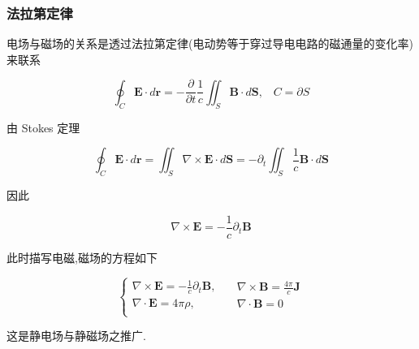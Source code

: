 \documentclass[aspectratio=2516]{beamer}
\begin{document}
\begin{frame}
\frametitle{\kaishu 法拉第定律}

\kaishu

\small

电场与磁场的关系是透过法拉第定律(电动势等于穿过导电电路的磁通量的变化率)来联系

\begin{equation}
\oint_C {\boldsymbol{E} \cdot d\boldsymbol{r}}  =  - \frac{\partial }{{\partial t}}\frac{1}{c}\iint_S {\boldsymbol{B} \cdot d\boldsymbol{S}},\;\;\;C = \partial S
\label{eq5.4.22}
\end{equation}

由 Stokes 定理

\begin{equation}
\oint_C {\boldsymbol{E} \cdot d\boldsymbol{r}}  = \iint_S {\nabla  \times \boldsymbol{E} \cdot d\boldsymbol{S}} =  - {\partial _t}\iint_S {\frac{1}{c}\boldsymbol{B} \cdot d\boldsymbol{S}}
\label{eq5.4.23}
\end{equation}

因此

\begin{equation}
\nabla  \times \boldsymbol{E} =  - \frac{1}{c}{\partial _t}\boldsymbol{B}
\label{eq5.4.24}
\end{equation}

此时描写电磁,磁场的方程如下

\begin{equation}
\left\{ {\begin{matrix}
	{\nabla  \times \boldsymbol{E} =  - \frac{1}{c}{\partial _t}\boldsymbol{B},}  \\ 
	{\nabla  \cdot \boldsymbol{E} = 4\pi \rho ,}  \\ 
	\end{matrix} } \right. \quad \begin{matrix}
{\nabla  \times \boldsymbol{B} = \frac{{4\pi }}{c}\boldsymbol{J}}  \\ 
{\nabla  \cdot \boldsymbol{B} = 0}  \\ 
\end{matrix} 
\label{eq5.4.25}
\end{equation}

这是静电场与静磁场之推广. 

\end{frame}

\end{document}
